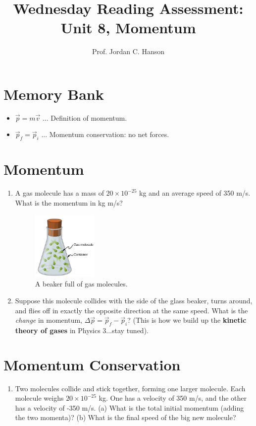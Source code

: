 \documentclass{article}
\begin{document}
\title{Wednesday Reading Assessment: Unit 8, Momentum}
\author{Prof. Jordan C. Hanson}

\maketitle

\section{Memory Bank}

\begin{itemize}
\item $\vec{p} = m \vec{v}$ ... Definition of momentum.
\item $\vec{p}_f = \vec{p}_i$ ... Momentum conservation: no net forces.
\end{itemize}

\section{Momentum}

\begin{enumerate}
\item A gas molecule has a mass of $20 \times 10^{-25}$ kg and an average speed of 350 m/s.  What is the momentum in kg m/s? \\ \vspace{1cm}
\begin{figure}[ht]
\centering
\includegraphics[width=0.3\textwidth]{gas.png}
\caption{\label{fig:gas} A beaker full of gas molecules.}
\end{figure}
\item Suppose this molecule collides with the side of the glass beaker, turns around, and flies off in exactly the opposite direction at the same speed.  What is the \textit{change} in momentum, $\Delta \vec{p} = \vec{p}_f - \vec{p}_i$?  (This is how we build up the \textbf{kinetic theory of gases} in Physics 3...stay tuned). \\ \vspace{1cm}
\end{enumerate}

\section{Momentum Conservation}
\begin{enumerate}
\item Two molecules collide and stick together, forming one larger molecule.  Each molecule weighs $20 \times 10^{-25}$ kg.  One has a velocity of 350 m/s, and the other has a velocity of -350 m/s.  (a) What is the total initial momentum (adding the two momenta)? (b) What is the final speed of the big new molecule?
\end{enumerate}
\end{document}
